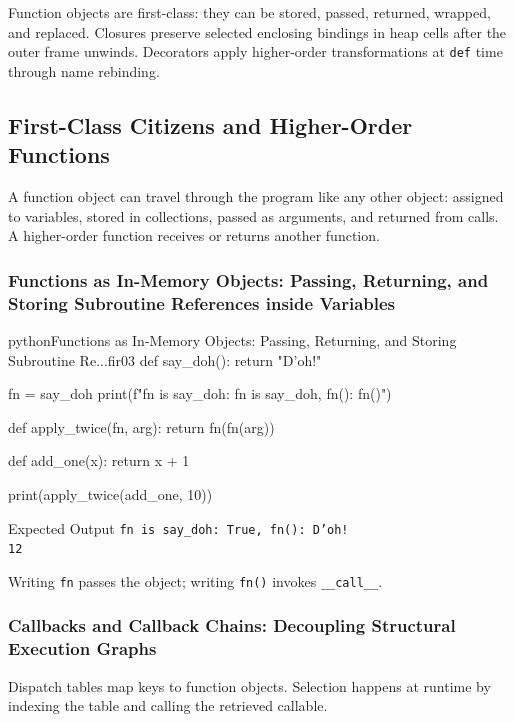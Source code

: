 \documentclass[a4paper,twoside]{report}
\begin{document}
Function objects are first-class: they can be stored, passed, returned, wrapped, and replaced. Closures preserve selected enclosing bindings in heap cells after the outer frame unwinds. Decorators apply higher-order transformations at \texttt{def} time through name rebinding.


\subsection{First-Class Citizens and Higher-Order Functions}

A function object can travel through the program like any other object: assigned to variables, stored in collections, passed as arguments, and returned from calls. A higher-order function receives or returns another function.

\subsubsection{Functions as In-Memory Objects: Passing, Returning, and Storing Subroutine References inside Variables}

\begin{codebox}[]{python}{Functions as In-Memory Objects: Passing, Returning, and Storing Subroutine Re...}{fir03}
def say_doh():
    return "D'oh!"

fn = say_doh
print(f"fn is say_doh: {fn is say_doh}, fn(): {fn()}")

def apply_twice(fn, arg):
    return fn(fn(arg))

def add_one(x):
    return x + 1

print(apply_twice(add_one, 10))
\end{codebox}


\begin{iobox}{Expected Output}
\texttt{fn is say\_doh: True, fn(): D'oh!} \\
\texttt{12} \\
\end{iobox}




Writing \texttt{fn} passes the object; writing \texttt{fn()} invokes \texttt{\_\_call\_\_}.

\subsubsection{Callbacks and Callback Chains: Decoupling Structural Execution Graphs}

Dispatch tables map keys to function objects. Selection happens at runtime by indexing the table and calling the retrieved callable.
\end{document}
